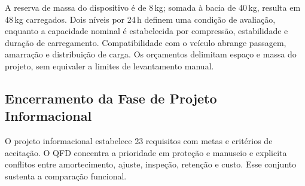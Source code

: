 A reserva de massa do dispositivo é de 8\,kg; somada à bacia de 40\,kg, resulta em 48\,kg carregados. Dois níveis por 24\,h definem uma condição de avaliação, enquanto a capacidade nominal é estabelecida por compressão, estabilidade e duração de carregamento. Compatibilidade com o veículo abrange passagem, amarração e distribuição de carga. Os orçamentos delimitam espaço e massa do projeto, sem equivaler a limites de levantamento manual.



\subsection{Encerramento da Fase de Projeto Informacional}

O projeto informacional estabelece 23 requisitos com metas e critérios de aceitação. O QFD concentra a prioridade em proteção e manuseio e explicita conflitos entre amortecimento, ajuste, inspeção, retenção e custo. Esse conjunto sustenta a comparação funcional.
